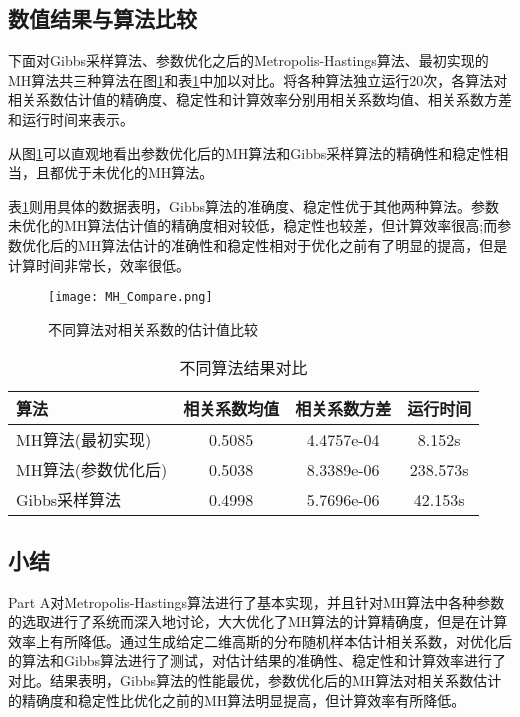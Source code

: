 \documentclass[11pt]{article}
\begin{document}
\subsection{数值结果与算法比较}

下面对Gibbs采样算法、参数优化之后的Metropolis-Hastings算法、最初实现的MH算法共三种算法在图\ref{MH_Compare}和表\ref{MHGibbsCom}中加以对比。将各种算法独立运行20次，各算法对相关系数估计值的精确度、稳定性和计算效率分别用相关系数均值、相关系数方差和运行时间来表示。

从图\ref{MH_Compare}可以直观地看出参数优化后的MH算法和Gibbs采样算法的精确性和稳定性相当，且都优于未优化的MH算法。

表\ref{MHGibbsCom}则用具体的数据表明，Gibbs算法的准确度、稳定性优于其他两种算法。参数未优化的MH算法估计值的精确度相对较低，稳定性也较差，但计算效率很高;而参数优化后的MH算法估计的准确性和稳定性相对于优化之前有了明显的提高，但是计算时间非常长，效率很低。

\begin{figure}[h]
    \centering
    \texttt{[image: MH\_Compare.png]}
    \caption{\scriptsize{不同算法对相关系数的估计值比较}}
    \label{MH_Compare}
\end{figure}

\begin{table}[tbp]
  \centering  
  \begin{tabular}{lccc} 
  \hline
  算法 & 相关系数均值 & 相关系数方差 & 运行时间\\ \hline
  MH算法(最初实现) & 0.5085 & 4.4757e-04 & 8.152s\\      
  MH算法(参数优化后) & 0.5038 & 8.3389e-06 & 238.573s\\
  Gibbs采样算法 & 0.4998 & 5.7696e-06 & 42.153s\\ \hline
\end{tabular}
\caption{不同算法结果对比}
\label{MHGibbsCom}
\end{table}


\subsection{小结}
Part A对Metropolis-Hastings算法进行了基本实现，并且针对MH算法中各种参数的选取进行了系统而深入地讨论，大大优化了MH算法的计算精确度，但是在计算效率上有所降低。通过生成给定二维高斯的分布随机样本估计相关系数，对优化后的算法和Gibbs算法进行了测试，对估计结果的准确性、稳定性和计算效率进行了对比。结果表明，Gibbs算法的性能最优，参数优化后的MH算法对相关系数估计的精确度和稳定性比优化之前的MH算法明显提高，但计算效率有所降低。
\end{document}
